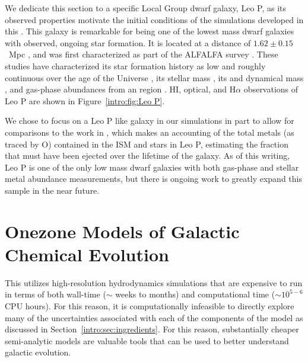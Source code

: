 We dedicate this section to a specific Local Group dwarf galaxy, Leo P, as its observed properties motivate the initial conditions of the simulations developed in this \Dissertation. This galaxy is remarkable for being one of the lowest mass dwarf galaxies with observed, ongoing star formation. It is located at a distance of $1.62\pm 0.15$~Mpc \citep{McQuinn2015a}, and was first characterized as part of the ALFALFA survey \citep{Giovanelli2013,Rhode2013,Skillman2013,McQuinn2013,Bernstein-Cooper2014}. These studies have characterized its star formation history as low and roughly continuous over the age of the Universe \citep[$<$SFR$>$ = $4.3\times 10^{-5}$~M$_{\odot}$~yr$^{-1}$,][]{McQuinn2015a}, its stellar mass \citep[$M_{*} = 5.7 \times 10^{5}$~M$_{\odot}$,][]{McQuinn2013}, its \hi and dynamical mass \citep[$M_{\rm HI}(r<r_{\rm HI}) = 9.5\times 10^{5}$~M$_{\odot}$, $M_{\rm dyn}(r<r_{\rm HI}) = 2.6 \times 10^{7}$~M$_{\odot}$, $r_{\rm HI} \sim 500$~pc,][]{Bernstein-Cooper2014}, and gas-phase abundances from an \hii region \citep[12 + log(O/H) = 7.17$\pm$0.04][]{Skillman2013}. HI, optical, and H$\alpha$ observations of Leo P are shown in Figure~\ref{intro:fig:Leo P}.

We chose to focus on a Leo P like galaxy in our simulations in part to allow for comparisons to the work in \cite{McQuinn2015}, which makes an accounting of the total metals (as traced by O) contained in the ISM and stars in Leo P, estimating the fraction that must have been ejected over the lifetime of the galaxy.
As of this writing, Leo P is one of the only low mass dwarf galaxies with both gas-phase and stellar metal abundance measurements, but there is ongoing work to greatly expand this sample in the near future.

\section{Onezone Models of Galactic Chemical Evolution}
\label{intro:sec:onezone}

This \dissertation utilizes high-resolution hydrodynamics simulations that are expensive to run in terms of both wall-time ($\sim$ weeks to months) and computational time ($\sim 10^{5-6}$ CPU hours). For this reason, it is computationally infeasible to directly explore many of the uncertainties associated with each of the components of the model as discussed in Section~\ref{intro:sec:ingredients}. For this reason, substantially cheaper semi-analytic models are valuable tools that can be used to better understand galactic evolution.

